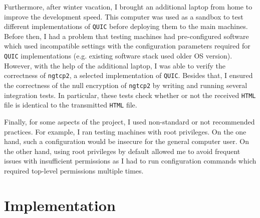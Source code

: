 \documentclass[12pt,a4paper,twoside,openright]{report}
\begin{document}
    Furthermore, after winter vacation, I brought an additional laptop from home to improve the development speed.
    This computer was used as a sandbox to test different implementations of \texttt{QUIC} before deploying them to the main machines.
    Before then, I had a problem that testing machines had pre-configured software which used incompatible settings with the configuration parameters required for \texttt{QUIC} implementations (e.g. existing software stack used older OS version).
    However, with the help of the additional laptop, I was able to verify the correctness of \texttt{ngtcp2}, a selected implementation of \texttt{QUIC}.
    Besides that, I ensured the correctness of the null encryption of \texttt{ngtcp2} by writing and running several integration tests.
    In particular, these tests check whether or not the received \texttt{HTML} file is identical to the transmitted \texttt{HTML} file.
    
    Finally, for some aspects of the project, I used non-standard or not recommended practices.
    For example, I ran testing machines with root privileges.
    On the one hand, such a configuration would be insecure for the general computer user. On the other hand, using root privileges by default allowed me to avoid frequent issues with insufficient permissions as I had to run configuration commands which required top-level permissions multiple times.
    
    

\chapter{Implementation}



\end{document}
